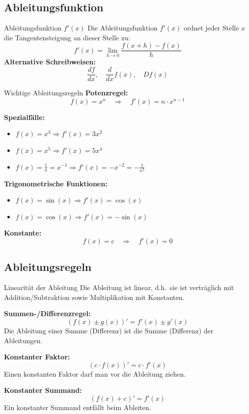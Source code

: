 \documentclass[a4paper,fontsize = 7pt]{scrartcl}
\begin{document}
\subsection{Ableitungsfunktion}

\begin{mainbox}{Ableitungsfunktion $f'(x)$}
	Die Ableitungsfunktion $f'(x)$ ordnet jeder Stelle $x$ die Tangentensteigung an dieser Stelle zu:
	$$f'(x) = \lim_{h \to 0} \frac{f(x + h) - f(x)}{h}$$
	\textbf{Alternative Schreibweisen:}
	$$\frac{df}{dx}, \quad \frac{d}{dx}f(x), \quad Df(x)$$
\end{mainbox}

\begin{mainbox}{Wichtige Ableitungsregeln}
\textbf{Potenzregel:}
$$f(x) = x^n \quad \Rightarrow \quad f'(x) = n \cdot x^{n-1}$$

\textbf{Spezialfälle:}
\begin{itemize}
	\item $f(x) = x^3 \Rightarrow f'(x) = 3x^2$
	\item $f(x) = x^5 \Rightarrow f'(x) = 5x^4$
	\item $f(x) = \frac{1}{x} = x^{-1} \Rightarrow f'(x) = -x^{-2} = -\frac{1}{x^2}$
\end{itemize}

\textbf{Trigonometrische Funktionen:}
\begin{itemize}
	\item $f(x) = \sin(x) \Rightarrow f'(x) = \cos(x)$
	\item $f(x) = \cos(x) \Rightarrow f'(x) = -\sin(x)$
\end{itemize}

\textbf{Konstante:}
$$f(x) = c \quad \Rightarrow \quad f'(x) = 0$$
\end{mainbox}

\subsection{Ableitungsregeln}

\begin{mainbox}{Linearität der Ableitung}
Die Ableitung ist linear, d.h.\ sie ist verträglich mit Addition/Subtraktion sowie Multiplikation mit Konstanten.

\textbf{Summen-/Differenzregel:}
$$(f(x) \pm g(x))' = f'(x) \pm g'(x)$$
Die Ableitung einer Summe (Differenz) ist die Summe (Differenz) der Ableitungen.

\textbf{Konstanter Faktor:}
$$(c \cdot f(x))' = c \cdot f'(x)$$
Einen konstanten Faktor darf man vor die Ableitung ziehen.

\textbf{Konstanter Summand:}
$$(f(x) + c)' = f'(x)$$
Ein konstanter Summand entfällt beim Ableiten.
\end{mainbox}
\end{document}
